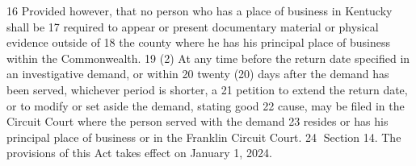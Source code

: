 16 Provided however, that no person who has a place of business in Kentucky shall be
17 required to appear or present documentary material or physical evidence outside of
18 the county where he has his principal place of business within the Commonwealth.
19 (2) At any time before the return date specified in an investigative demand, or within
20 twenty (20) days after the demand has been served, whichever period is shorter, a
21 petition to extend the return date, or to modify or set aside the demand, stating good
22 cause, may be filed in the Circuit Court where the person served with the demand
23 resides or has his principal place of business or in the Franklin Circuit Court.
24 Section 14. The provisions of this Act takes effect on January 1, 2024.